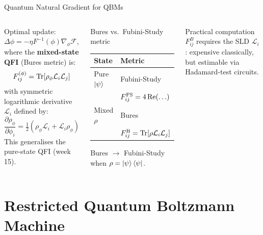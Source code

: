 \documentclass[aspectratio=169,10pt]{beamer}
\begin{document}
\begin{frame}{Quantum Natural Gradient for QBMs}
  \begin{columns}[T]
      Optimal update: $\Delta\phi = -\eta F^{-1}(\phi)\nabla_\phi\mathcal{F}$,
      where the \textbf{mixed-state QFI} (Bures metric) is:
      \[
        F_{ij}^{(\phi)}
        = \Tr\!\left[\rho_\phi \mathcal{L}_i\mathcal{L}_j\right]
      \]
      with symmetric logarithmic derivative $\mathcal{L}_i$ defined by:
      \[
        \frac{\partial\rho_\phi}{\partial\phi_i}
        = \tfrac{1}{2}(\rho_\phi\mathcal{L}_i + \mathcal{L}_i\rho_\phi)
      \]
      This generalises the pure-state QFI (week 15).
      \begin{block}{Bures vs.\ Fubini-Study metric}
        \small
        \renewcommand{\arraystretch}{1.15}
        \begin{tabular}{ll}
          \toprule
          State & Metric \\
          \midrule
          Pure $\ket{\psi}$ & Fubini-Study\\
                            & $F_{ij}^{\rm FS}=4\,\mathrm{Re}(\ldots)$ \\
          Mixed $\rho$      & Bures \\
                            & $F_{ij}^{\rm B}=\Tr[\rho\mathcal{L}_i\mathcal{L}_j]$ \\
          \bottomrule
        \end{tabular}
        \vspace{0.1cm}

        Bures $\to$ Fubini-Study when
        $\rho=\ket{\psi}\bra{\psi}$.
      \end{block}
      \vspace{0.1cm}
      \begin{alertblock}{Practical computation}
        $F^B_{ij}$ requires the SLD $\mathcal{L}_i$:
        expensive classically, but estimable via
        Hadamard-test circuits.
      \end{alertblock}
  \end{columns}
\end{frame}

\section{Restricted Quantum Boltzmann Machine}
\end{document}

